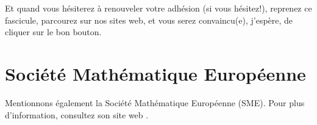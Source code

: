 Et quand vous h\'esiterez \`a renouveler votre adh\'esion (si vous h\'esitez!), reprenez ce fascicule, parcourez sur nos sites web, et vous serez convaincu(e), j'esp\`ere, de cliquer sur le bon bouton.




\section{Soci\'et\'e Math\'ematique Europ\'eenne}

Mentionnons \'egalement la Soci\'et\'e Math\'ematique Europ\'eenne
(SME). Pour plus d'information, consultez son site web .


